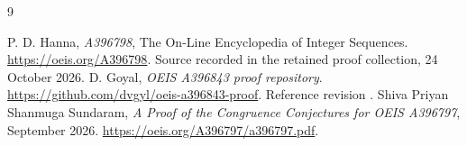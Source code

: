 \documentclass[11pt,a4paper]{article}
\theoremstyle{remark}\newtheorem{remark}[theorem]{Remark}
\begin{document}
\begin{thebibliography}{9}\raggedright
{} P. D. Hanna, \emph{A396798}, The On-Line Encyclopedia of Integer
Sequences. \url{https://oeis.org/A396798}. Source recorded in the retained
proof collection, 24 October 2026.
 D. Goyal, \emph{OEIS A396843 proof repository}.
\url{https://github.com/dvgyl/oeis-a396843-proof}.
Reference revision .
 Shiva Priyan Shanmuga Sundaram,
\emph{A Proof of the Congruence Conjectures for OEIS A396797}, September 2026.
\url{https://oeis.org/A396797/a396797.pdf}.
\end{thebibliography}
\end{document}
